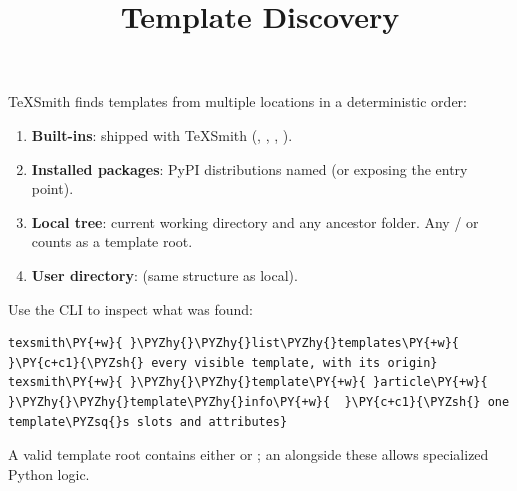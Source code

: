 \documentclass[a4paper,twoside]{article}
\title{Template Discovery}
\author{}\date{}
\begin{document}
\maketitle
TeXSmith finds templates from multiple locations in a deterministic order:
\begin{enumerate}
\item \textbf{Built-ins}: shipped with TeXSmith (, , , ).
\item \textbf{Installed packages}: PyPI distributions named  (or exposing the  entry point).
\item \textbf{Local tree}: current working directory and any ancestor  folder. Any / or  counts as a template root.
\item \textbf{User directory}:  (same structure as local).
\end{enumerate}
Use the CLI to inspect what was found:
\begin{tscode}[lang=bash, engine=pygments]
\begin{Verbatim}[commandchars=\\\{\},breaklines, breakanywhere, commandchars=\\\{\}]
texsmith\PY{+w}{ }\PYZhy{}\PYZhy{}list\PYZhy{}templates\PY{+w}{                    }\PY{c+c1}{\PYZsh{} every visible template, with its origin}
texsmith\PY{+w}{ }\PYZhy{}\PYZhy{}template\PY{+w}{ }article\PY{+w}{ }\PYZhy{}\PYZhy{}template\PYZhy{}info\PY{+w}{  }\PY{c+c1}{\PYZsh{} one template\PYZsq{}s slots and attributes}
\end{Verbatim}
\end{tscode}
A valid template root contains either  or ; an  alongside these allows specialized Python logic.
\end{document}
